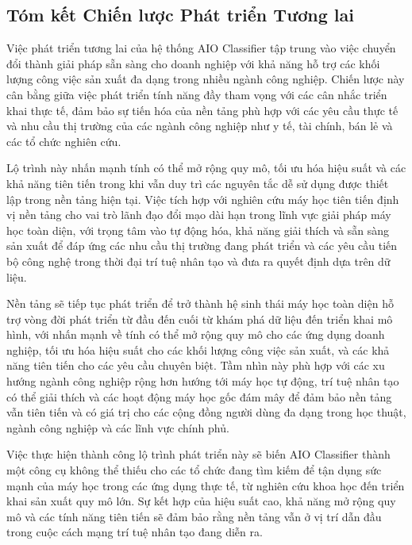 \subsection{Tóm kết Chiến lược Phát triển Tương lai}

\noindent
Việc phát triển tương lai của hệ thống AIO Classifier tập trung vào việc chuyển đổi thành giải pháp sẵn sàng cho doanh nghiệp với khả năng hỗ trợ các khối lượng công việc sản xuất đa dạng trong nhiều ngành công nghiệp. Chiến lược này cân bằng giữa việc phát triển tính năng đầy tham vọng với các cân nhắc triển khai thực tế, đảm bảo sự tiến hóa của nền tảng phù hợp với các yêu cầu thực tế và nhu cầu thị trường của các ngành công nghiệp như y tế, tài chính, bán lẻ và các tổ chức nghiên cứu.

Lộ trình này nhấn mạnh tính có thể mở rộng quy mô, tối ưu hóa hiệu suất và các khả năng tiên tiến trong khi vẫn duy trì các nguyên tắc dễ sử dụng được thiết lập trong nền tảng hiện tại. Việc tích hợp với nghiên cứu máy học tiên tiến định vị nền tảng cho vai trò lãnh đạo đổi mạo dài hạn trong lĩnh vực giải pháp máy học toàn diện, với trọng tâm vào tự động hóa, khả năng giải thích và sẵn sàng sản xuất để đáp ứng các nhu cầu thị trường đang phát triển và các yêu cầu tiến bộ công nghệ trong thời đại trí tuệ nhân tạo và đưa ra quyết định dựa trên dữ liệu.

Nền tảng sẽ tiếp tục phát triển để trở thành hệ sinh thái máy học toàn diện hỗ trợ vòng đời phát triển từ đầu đến cuối từ khám phá dữ liệu đến triển khai mô hình, với nhấn mạnh về tính có thể mở rộng quy mô cho các ứng dụng doanh nghiệp, tối ưu hóa hiệu suất cho các khối lượng công việc sản xuất, và các khả năng tiên tiến cho các yêu cầu chuyên biệt. Tầm nhìn này phù hợp với các xu hướng ngành công nghiệp rộng hơn hướng tới máy học tự động, trí tuệ nhân tạo có thể giải thích và các hoạt động máy học gốc đám mây để đảm bảo nền tảng vẫn tiên tiến và có giá trị cho các cộng đồng người dùng đa dạng trong học thuật, ngành công nghiệp và các lĩnh vực chính phủ.

Việc thực hiện thành công lộ trình phát triển này sẽ biến AIO Classifier thành một công cụ không thể thiếu cho các tổ chức đang tìm kiếm để tận dụng sức mạnh của máy học trong các ứng dụng thực tế, từ nghiên cứu khoa học đến triển khai sản xuất quy mô lớn. Sự kết hợp của hiệu suất cao, khả năng mở rộng quy mô và các tính năng tiên tiến sẽ đảm bảo rằng nền tảng vẫn ở vị trí dẫn đầu trong cuộc cách mạng trí tuệ nhân tạo đang diễn ra.